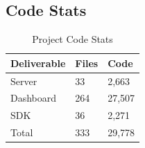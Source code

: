 \subsection{Code Stats}

\begin{table}[!h]
\centering
\caption{Project Code Stats}
\label{my-label}
\begin{tabular}{|l|l|l|}
\hline
\rowcolor{green!20}
Deliverable & Files & Code   \\ \hline
Server      & 33    & 2,663  \\ \hline
Dashboard   & 264   & 27,507 \\ \hline
SDK         & 36    & 2,271  \\ \hline
Total       & 333   & 29,778 \\ \hline
\end{tabular}
\end{table}
